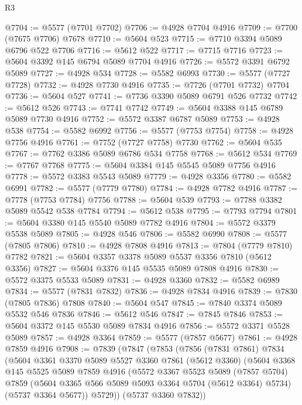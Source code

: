 \begin{lexlean}{R3}
\begin{coremodule}
@7704 := @5577 (@7701 @7702)
@7706 := @4928 @7704 @4916
@7709 := @7700 (@7675 @7706) @7678
@7710 := @5604 @523
@7715 := @7710 @3394 @5089 @6796 @522 @7706
@7716 := @5612 @522
@7717 := @7715 @7716
@7723 := @5604 @3392 @145 @6794 @5089 @7704 @4916
@7726 := @5572 @3391 @6792 @5089
@7727 := @4928 @534
@7728 := @5582 @6993
@7730 := @5577 (@7727 @7728)
@7732 := @4928 @7730 @4916
@7735 := @7726 (@7701 @7732) @7704
@7736 := @5604 @527
@7741 := @7736 @3390 @5089 @6791 @526 @7732
@7742 := @5612 @526
@7743 := @7741 @7742
@7749 := @5604 @3388 @145 @6789 @5089 @7730 @4916
@7752 := @5572 @3387 @6787 @5089
@7753 := @4928 @538
@7754 := @5582 @6992
@7756 := @5577 (@7753 @7754)
@7758 := @4928 @7756 @4916
@7761 := @7752 (@7727 @7758) @7730
@7762 := @5604 @535
@7767 := @7762 @3386 @5089 @6786 @534 @7758
@7768 := @5612 @534
@7769 := @7767 @7768
@7775 := @5604 @3384 @145 @5545 @5089 @7756 @4916
@7778 := @5572 @3383 @5543 @5089
@7779 := @4928 @3356
@7780 := @5582 @6991
@7782 := @5577 (@7779 @7780)
@7784 := @4928 @7782 @4916
@7787 := @7778 (@7753 @7784) @7756
@7788 := @5604 @539
@7793 := @7788 @3382 @5089 @5542 @538 @7784
@7794 := @5612 @538
@7795 := @7793 @7794
@7801 := @5604 @3380 @145 @5540 @5089 @7782 @4916
@7804 := @5572 @3379 @5538 @5089
@7805 := @4928 @546
@7806 := @5582 @6990
@7808 := @5577 (@7805 @7806)
@7810 := @4928 @7808 @4916
@7813 := @7804 (@7779 @7810) @7782
@7821 := @5604 @3357 @3378 @5089 @5537 @3356 @7810 (@5612 @3356)
@7827 := @5604 @3376 @145 @5535 @5089 @7808 @4916
@7830 := @5572 @3375 @5533 @5089
@7831 := @4928 @3360
@7832 := @5582 @6989
@7834 := @5577 (@7831 @7832)
@7836 := @4928 @7834 @4916
@7839 := @7830 (@7805 @7836) @7808
@7840 := @5604 @547
@7845 := @7840 @3374 @5089 @5532 @546 @7836
@7846 := @5612 @546
@7847 := @7845 @7846
@7853 := @5604 @3372 @145 @5530 @5089 @7834 @4916
@7856 := @5572 @3371 @5528 @5089
@7857 := @4928 @3364
@7859 := @5577 (@7857 @5677)
@7861 := @4928 @7859 @4916
@7908 := @7839
    (@7847
      (@7853
        (@7856
          (@7831 @7861)
          @7834
          (@5604
            @3361
            @3370
            @5089
            @5527
            @3360
            @7861
            (@5612 @3360)
            (@5604
              @3368
              @145
              @5525
              @5089
              @7859
              @4916
              (@5572
                @3367
                @5523
                @5089
                (@7857 @5704)
                @7859
                (@5604 @3365 @566 @5089 @5093 @3364 @5704 (@5612 @3364) @5734)
                (@5737 @3364 @5677))
              @5729))
          (@5737 @3360 @7832))

\end{coremodule}
\end{lexlean}

